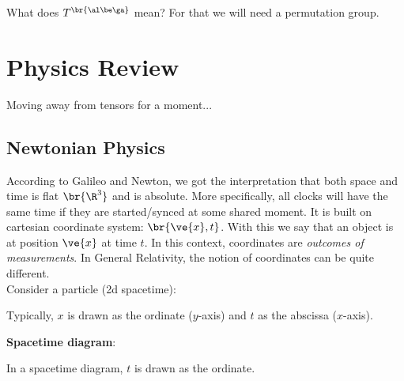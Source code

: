 \documentclass{article}
\newcommand{\heading}[1]{\vspace{0.1in}\textbf{#1}:}
\begin{document}
What does $T^{\br{\al\be\ga}}$ mean? For that we will need a permutation group.

\section{Physics Review}

Moving away from tensors for a moment... \\

\subsection{Newtonian Physics}

According to Galileo and Newton, we got the interpretation that both space and time is flat $\br{\R^3}$ and is absolute. More specifically, all clocks will have the same time if they are started/synced at some shared moment. It is built on cartesian coordinate system: $\br{\ve{x}, t}$. With this we say that an object is at position $\ve{x}$ at time $t$. In this context, coordinates are \textit{outcomes of measurements}. In General Relativity, the notion of coordinates can be quite different. \\

Consider a particle (2d spacetime):

\begin{center}
\end{center}

Typically, $x$ is drawn as the ordinate ($y$-axis) and $t$ as the abscissa ($x$-axis).

\heading{Spacetime diagram}

In a spacetime diagram, $t$ is drawn as the ordinate.

\begin{center}
\end{center}
\end{document}
